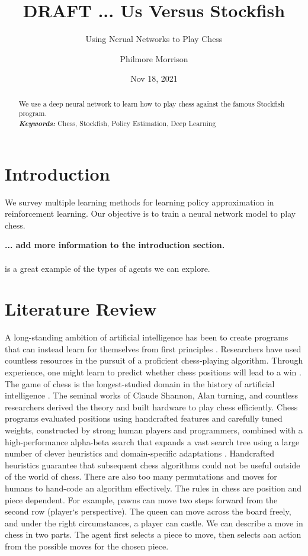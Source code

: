 \documentclass[12pt]{turabian-researchpaper}
\title{DRAFT ... Us Versus Stockfish}
\subtitle{Using Nerual Networks to Play Chess}
\author{Philmore Morrison}
\date{Nov 18, 2021}
\providecommand{\keywords}[1]{\textbf{\textit{Keywords:}} #1}
\begin{document}
\maketitle

\begin{abstract}
    \noindent
    We use a deep neural network to learn how to play chess against the famous Stockfish program.\\
\noindent\keywords{Chess, Stockfish, Policy Estimation, Deep Learning}
\end{abstract}

\section*{Introduction}

We survey multiple learning methods for learning policy approximation in reinforcement learning. Our objective is to train a neural network model to play chess. 

\textbf{... add more information to the introduction section.}
\textbf{\\\color{orange}{https://github.com/arjangroen/RLC} \\}  is a great example of the types of agents we can explore.


\section{Literature Review}

A long-standing ambition of artificial intelligence has been to create programs that can instead learn for themselves from first principles \parencite{silver_general_2018}. Researchers have used countless resources in the pursuit of a proficient chess-playing algorithm. Through experience, one might learn to predict whether chess positions will lead to a win \parencite{sutton1988learning}. The game of chess is the longest-studied domain in the history of artificial intelligence \parencite{silver_general_2018}. The seminal works of Claude Shannon, Alan turning, and countless researchers derived the theory and built hardware to play chess efficiently. Chess programs evaluated positions using handcrafted features and carefully tuned weights, constructed by strong human players and programmers, combined with a high-performance alpha-beta search that expands a vast search tree using a large number of clever heuristics and domain-specific adaptations \parencite{silver_general_2018}. Handcrafted heuristics guarantee that subsequent chess algorithms could not be useful outside of the world of chess. There are also too many permutations and moves for humans to hand-code an algorithm effectively. The rules in chess are position and piece dependent. For example, pawns can move two steps forward from the second row (player‘s perspective). The queen can move across the board freely, and under the right circumstances, a player can castle. We can describe a move in chess in two parts. The agent first selects a piece to move, then selects aan action from the possible moves for the chosen piece.
\end{document}
